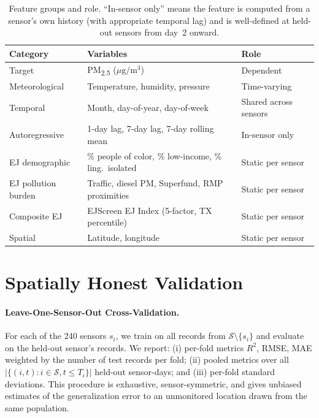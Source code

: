 \documentclass{article}
\begin{document}
\begin{table}[t]
\caption{Feature groups and role. ``In-sensor only'' means the feature is computed from a sensor's own history (with appropriate temporal lag) and is well-defined at held-out sensors from day~2 onward.}
\label{tab:features}
\centering
\small
\begin{tabular}{lll}
\toprule
\textbf{Category} & \textbf{Variables} & \textbf{Role} \\
\midrule
Target                 & PM\textsubscript{2.5} ($\mu\mathrm{g}/\mathrm{m}^3$) & Dependent \\
Meteorological         & Temperature, humidity, pressure                      & Time-varying \\
Temporal               & Month, day-of-year, day-of-week                       & Shared across sensors \\
Autoregressive         & 1-day lag, 7-day lag, 7-day rolling mean              & In-sensor only \\
EJ demographic         & \% people of color, \% low-income, \% ling.\ isolated & Static per sensor \\
EJ pollution burden    & Traffic, diesel PM, Superfund, RMP proximities        & Static per sensor \\
Composite EJ           & EJScreen EJ Index (5-factor, TX percentile)           & Static per sensor \\
Spatial                & Latitude, longitude                                   & Static per sensor \\
\bottomrule
\end{tabular}
\end{table}

\section{Spatially Honest Validation}
\label{sec:validation}

\paragraph{Leave-One-Sensor-Out Cross-Validation.} For each of the 240 sensors $s_i$, we train on all records from $\mathcal{S}\setminus\{s_i\}$ and evaluate on the held-out sensor's records. We report: (i) per-fold metrics $R^2$, RMSE, MAE weighted by the number of test records per fold; (ii) pooled metrics over all $|\{(i,t) : i \in \mathcal{S}, t \leq T_i\}|$ held-out sensor-days; and (iii) per-fold standard deviations. This procedure is exhaustive, sensor-symmetric, and gives unbiased estimates of the generalization error to an unmonitored location drawn from the same population.
\end{document}
